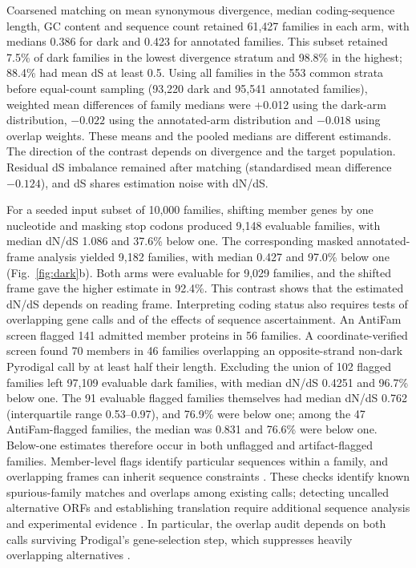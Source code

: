 \documentclass[11pt]{article}
\begin{document}
Coarsened matching on mean synonymous divergence, median coding-sequence length, GC content
and sequence count retained 61{,}427 families in each arm, with medians 0.386 for dark and 0.423 for annotated families.
This subset retained 7.5\% of dark families in the lowest divergence stratum and 98.8\% in
the highest; 88.4\% had mean dS at least 0.5. Using all families in the 553 common strata before equal-count sampling
(93{,}220 dark and 95{,}541 annotated families), weighted mean differences of family medians were +0.012 using the dark-arm distribution,
$-0.022$ using the annotated-arm distribution and $-0.018$ using overlap weights.
These means and the pooled medians are different estimands. The direction of the contrast
depends on divergence and the target population. Residual dS imbalance remained after matching
(standardised mean difference $-0.124$), and dS shares estimation noise with dN/dS.

For a seeded input subset of 10{,}000 families, shifting member genes by one nucleotide and
masking stop codons produced 9{,}148 evaluable families, with median dN/dS 1.086 and 37.6\%
below one. The corresponding masked annotated-frame analysis yielded 9{,}182 families, with
median 0.427 and 97.0\% below one (Fig.~\ref{fig:dark}b). Both arms were evaluable for 9{,}029 families, and the shifted
frame gave the higher estimate in 92.4\%. This contrast shows that the estimated dN/dS
depends on reading frame. Interpreting coding status also requires tests of overlapping gene
calls and of the effects of sequence ascertainment.
An AntiFam screen flagged 141 admitted member proteins in 56 families. A coordinate-verified
screen found 70 members in 46 families overlapping an opposite-strand non-dark Pyrodigal call
by at least half their length. Excluding the union of 102 flagged families left 97{,}109
evaluable dark families, with median dN/dS 0.4251 and 96.7\% below one. The 91 evaluable flagged families themselves had median dN/dS 0.762 (interquartile range 0.53--0.97), and 76.9\% were below one; among the 47 AntiFam-flagged families, the median was 0.831 and 76.6\% were below one. Below-one estimates therefore occur in both unflagged and artifact-flagged families. Member-level flags identify particular sequences within a family, and overlapping frames can inherit sequence constraints \citep{nelson2020olgenie,yooseph2007gos}. These checks identify
known spurious-family matches and overlaps among existing calls; detecting uncalled alternative
ORFs and establishing translation require additional sequence analysis and experimental evidence \citep{eberhardt2012antifam}. In particular, the overlap audit depends on both calls surviving Prodigal's gene-selection step, which suppresses heavily overlapping alternatives \citep{hyatt2010prodigal}.
\end{document}
